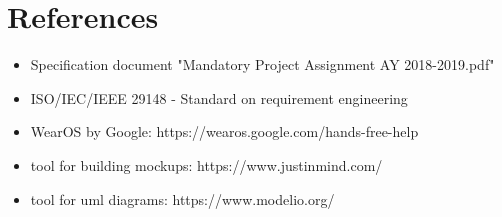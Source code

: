 \chapter{References}

\begin{itemize}
\item Specification document "Mandatory Project Assignment AY 2018-2019.pdf"
\item ISO/IEC/IEEE 29148 - Standard on requirement engineering
\item WearOS by Google: https://wearos.google.com/hands-free-help
\item tool for building mockups: https://www.justinmind.com/
\item tool for uml diagrams: https://www.modelio.org/
\end{itemize}